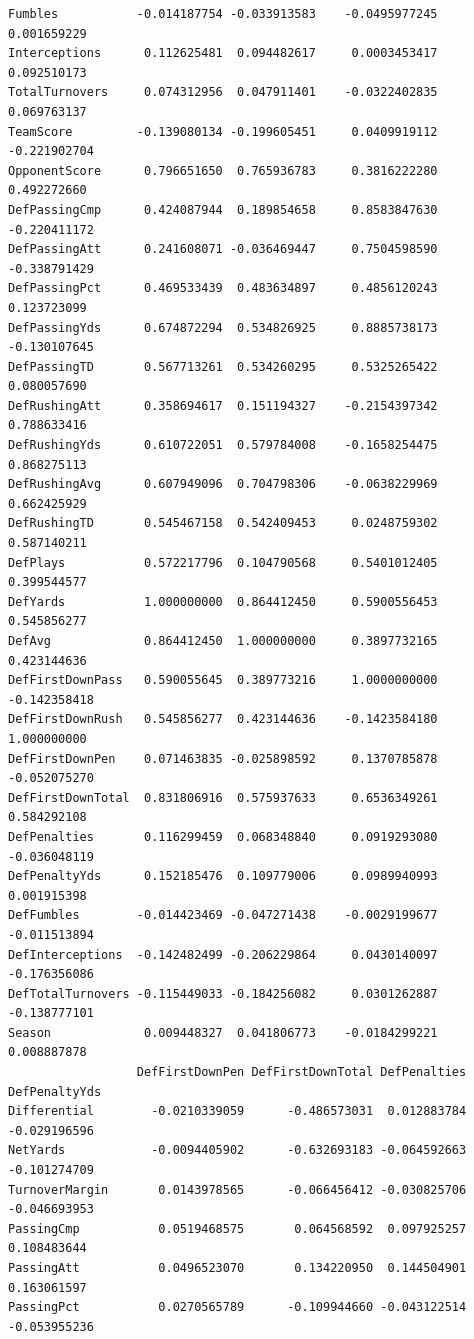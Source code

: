 \documentclass[
  letterpaper,
  DIV=11,
  numbers=noendperiod]{scrreprt}
\begin{document}
\begin{verbatim}
Fumbles           -0.014187754 -0.033913583    -0.0495977245      0.001659229
Interceptions      0.112625481  0.094482617     0.0003453417      0.092510173
TotalTurnovers     0.074312956  0.047911401    -0.0322402835      0.069763137
TeamScore         -0.139080134 -0.199605451     0.0409919112     -0.221902704
OpponentScore      0.796651650  0.765936783     0.3816222280      0.492272660
DefPassingCmp      0.424087944  0.189854658     0.8583847630     -0.220411172
DefPassingAtt      0.241608071 -0.036469447     0.7504598590     -0.338791429
DefPassingPct      0.469533439  0.483634897     0.4856120243      0.123723099
DefPassingYds      0.674872294  0.534826925     0.8885738173     -0.130107645
DefPassingTD       0.567713261  0.534260295     0.5325265422      0.080057690
DefRushingAtt      0.358694617  0.151194327    -0.2154397342      0.788633416
DefRushingYds      0.610722051  0.579784008    -0.1658254475      0.868275113
DefRushingAvg      0.607949096  0.704798306    -0.0638229969      0.662425929
DefRushingTD       0.545467158  0.542409453     0.0248759302      0.587140211
DefPlays           0.572217796  0.104790568     0.5401012405      0.399544577
DefYards           1.000000000  0.864412450     0.5900556453      0.545856277
DefAvg             0.864412450  1.000000000     0.3897732165      0.423144636
DefFirstDownPass   0.590055645  0.389773216     1.0000000000     -0.142358418
DefFirstDownRush   0.545856277  0.423144636    -0.1423584180      1.000000000
DefFirstDownPen    0.071463835 -0.025898592     0.1370785878     -0.052075270
DefFirstDownTotal  0.831806916  0.575937633     0.6536349261      0.584292108
DefPenalties       0.116299459  0.068348840     0.0919293080     -0.036048119
DefPenaltyYds      0.152185476  0.109779006     0.0989940993      0.001915398
DefFumbles        -0.014423469 -0.047271438    -0.0029199677     -0.011513894
DefInterceptions  -0.142482499 -0.206229864     0.0430140097     -0.176356086
DefTotalTurnovers -0.115449033 -0.184256082     0.0301262887     -0.138777101
Season             0.009448327  0.041806773    -0.0184299221      0.008887878
                  DefFirstDownPen DefFirstDownTotal DefPenalties DefPenaltyYds
Differential        -0.0210339059      -0.486573031  0.012883784  -0.029196596
NetYards            -0.0094405902      -0.632693183 -0.064592663  -0.101274709
TurnoverMargin       0.0143978565      -0.066456412 -0.030825706  -0.046693953
PassingCmp           0.0519468575       0.064568592  0.097925257   0.108483644
PassingAtt           0.0496523070       0.134220950  0.144504901   0.163061597
PassingPct           0.0270565789      -0.109944660 -0.043122514  -0.053955236

\end{verbatim}
\end{document}
